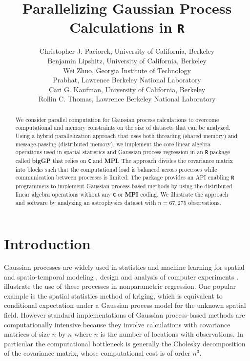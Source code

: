 \documentclass[12pt]{article}
\newcommand{\proglang}[1]{\textbf{\texttt{#1}}}
\newcommand{\pkg}[1]{\textbf{#1}}
\begin{document}
\author{Christopher J. Paciorek, University of California, Berkeley\\
  Benjamin Lipshitz, University of California, Berkeley\\
Wei Zhuo, Georgia Institute of Technology\\
 Prabhat, Lawrence Berkeley National Laboratory\\
 Cari G. Kaufman, University of California, Berkeley\\
Rollin C. Thomas, Lawrence Berkeley National Laboratory}

\title{Parallelizing Gaussian Process Calculations in \proglang{R}}

\maketitle

\begin{abstract}
  We consider parallel computation for Gaussian process calculations
  to overcome computational and memory constraints 
  on the size of datasets that can be analyzed.  Using a hybrid parallelization approach that uses both
  threading (shared memory) and message-passing (distributed memory), we
  implement the core linear algebra operations used in spatial
  statistics and Gaussian process regression in an \proglang{R} package called \pkg{bigGP} that relies on \proglang{C} and \pkg{MPI}. The approach divides the covariance matrix into blocks such that the computational
load is balanced across processes while communication between processes is limited. The package
  provides an API enabling \proglang{R} programmers to implement Gaussian process-based
  methods by using the distributed linear algebra operations without any \proglang{C} or \pkg{MPI} coding.
  We illustrate the approach and software by analyzing an astrophysics
  dataset with $n=67,275$ observations.
\end{abstract}


\section{Introduction}
Gaussian processes are widely used in statistics and machine learning
 for spatial and spatio-temporal modeling \citep{Bane:etal:2003}, design and analysis of computer experiments \citep{Kenn:OHag:2001}. \cite{Rasm:Will:2006} illustrate the use of these processes in nonparametric regression. 
One popular example is the spatial statistics method of kriging, which is equivalent to conditional expectation under a Gaussian process model for the  unknown spatial field.
However standard implementations of Gaussian process-based methods 
are computationally intensive because they involve calculations with
covariance matrices of size $n$ by $n$ where $n$ is the number of
locations with observations. In particular the computational
bottleneck is generally the Cholesky decomposition of the covariance
matrix, whose computational cost is of order $n^3$. 
\end{document}
